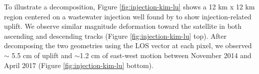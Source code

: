 To illustrate a decomposition, Figure \ref{fig:injection-kim-lu} shows a 12 km x 12 km region centered on a wastewater injection well found by \cite{Kim2018AssociationLocalizedGeohazards} to show injection-related uplift. We observe similar magnitude deformation toward the satellite in both ascending and descending tracks (Figure \ref{fig:injection-kim-lu} top). After decomposing the two geometries using the LOS vector at each pixel, we observed $\sim$ 5.5 cm of uplift and $\sim$1.2 cm of east-west motion between November 2014 and April 2017 (Figure \ref{fig:injection-kim-lu} bottom). 




